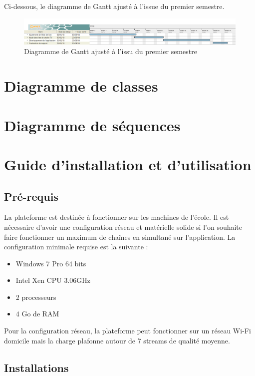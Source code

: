 \documentclass{polytech/polytech}
\begin{document}
Ci-dessous, le diagramme de Gantt ajusté à l'issue du premier semestre.

\begin{figure}
	\includegraphics[scale=0.25]{images/Diagramme_PR&D2}
	\caption{Diagramme de Gantt ajusté à l'issu du premier semestre}
	\label{fig:gantt2}
\end{figure}


\chapter{Diagramme de classes}


\chapter{Diagramme de séquences}


\chapter{Guide d'installation et d'utilisation}


\section{Pré-requis}


La plateforme est destinée à fonctionner sur les machines de l’école. Il est nécessaire d'avoir une configuration réseau et matérielle solide si l'on souhaite faire fonctionner un maximum de chaînes en simultané sur l'application. La configuration minimale requise est la suivante :

\begin{itemize}
	\item Windows 7 Pro 64 bits
	\item Intel Xen CPU 3.06GHz
	\item 2 processeurs
	\item 4 Go de RAM
\end{itemize}


Pour la configuration réseau, la plateforme peut fonctionner sur un réseau Wi-Fi domicile mais la charge plafonne autour de 7 streams de qualité moyenne.


\section{Installations}
\end{document}
